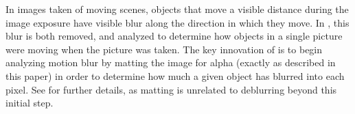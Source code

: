 In images taken of moving scenes, objects that move a visible distance during the image exposure have visible blur along the direction in which they move. In \cite{dai08}, this blur is both removed, and analyzed to determine how objects in a single picture were moving when the picture was taken. The key innovation of \cite{dai08} is to begin analyzing motion blur by matting the image for alpha (exactly as described in this paper) in order to determine how much a given object has blurred into each pixel. See \cite{dai08} for further details, as matting is unrelated to deblurring beyond this initial step.
